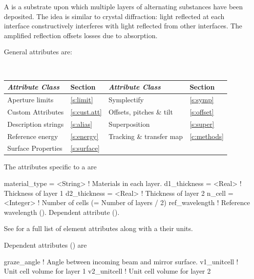 {A  is a substrate upon which multiple layers of alternating substances have
been deposited. The idea is similar to crystal diffraction: light reflected at each interface
constructively interferes with light reflected from other interfaces. The amplified reflection
offsets losses due to absorption.

General  attributes are:
\begin{center}
\tt
\begin{tabular}{llll} \toprule
  {\sl Attribute Class}      & Section           & {\sl Attribute Class}      & Section         \\ \midrule
  Aperture limits            & \ref{s:limit}     & Symplectify                & \ref{s:symp}    \\
  Custom Attributes          & \ref{s:cust.att}  & Offsets, pitches \& tilt   & \ref{s:offset}  \\
  Description strings        & \ref{s:alias}     & Superposition              & \ref{s:super}   \\
  Reference energy           & \ref{s:energy}    & Tracking \& transfer map   & \ref{c:methods} \\
  Surface Properties         & \ref{s:surface}   &                            &                 \\
  \bottomrule
\end{tabular}
\end{center}
\toffset

The attributes specific to a  are 
\begin{example}
  material_type    = <String>  ! Materials in each layer.
  d1_thickness     = <Real>    ! Thickness of layer 1
  d2_thickness     = <Real>    ! Thickness of layer 2
  n_cell           = <Integer> ! Number of cells (= Number of layers / 2)
  ref_wavelength               ! Reference wavelength (). Dependent attribute ().
\end{example}
See  for a full list of element attributes along with a their units.

Dependent attributes () are
\begin{example}
  graze_angle      ! Angle between incoming beam and mirror surface.
  v1_unitcell      ! Unit cell volume for layer 1
  v2_unitcell      ! Unit cell volume for layer 2 
\end{example}

}
